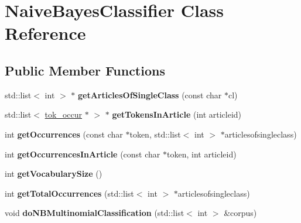 \hypertarget{classNaiveBayesClassifier}{\section{Naive\-Bayes\-Classifier Class Reference}
\label{classNaiveBayesClassifier}
}
\subsection*{Public Member Functions}
\begin{DoxyCompactItemize}
\item 
\hypertarget{classNaiveBayesClassifier_a6f3c5d047afa957a29979d231bc70889}{std\-::list$<$ int $>$ $\ast$ {\bfseries get\-Articles\-Of\-Single\-Class} (const char $\ast$cl)}\label{classNaiveBayesClassifier_a6f3c5d047afa957a29979d231bc70889}

\item 
\hypertarget{classNaiveBayesClassifier_a1fb3616da17ea4ebda17b4f3575ad320}{std\-::list$<$ \hyperlink{structtok__occur}{tok\-\_\-occur} $\ast$ $>$ $\ast$ {\bfseries get\-Tokens\-In\-Article} (int articleid)}\label{classNaiveBayesClassifier_a1fb3616da17ea4ebda17b4f3575ad320}

\item 
\hypertarget{classNaiveBayesClassifier_a89ae9b2c0153869d50e27ecb689982af}{int {\bfseries get\-Occurrences} (const char $\ast$token, std\-::list$<$ int $>$ $\ast$articlesofsingleclass)}\label{classNaiveBayesClassifier_a89ae9b2c0153869d50e27ecb689982af}

\item 
\hypertarget{classNaiveBayesClassifier_aa2d107c48a5457e1d115cfbb839f60e0}{int {\bfseries get\-Occurrences\-In\-Article} (const char $\ast$token, int articleid)}\label{classNaiveBayesClassifier_aa2d107c48a5457e1d115cfbb839f60e0}

\item 
\hypertarget{classNaiveBayesClassifier_a18dfddfbbae1b120bcee49f78c75ded4}{int {\bfseries get\-Vocabulary\-Size} ()}\label{classNaiveBayesClassifier_a18dfddfbbae1b120bcee49f78c75ded4}

\item 
\hypertarget{classNaiveBayesClassifier_a4faf67f3daaba12487cee5886a4a64e9}{int {\bfseries get\-Total\-Occurrences} (std\-::list$<$ int $>$ $\ast$articlesofsingleclass)}\label{classNaiveBayesClassifier_a4faf67f3daaba12487cee5886a4a64e9}

\item 
\hypertarget{classNaiveBayesClassifier_ae51e09d4d9407b43f3d57e814a0cfc27}{void {\bfseries do\-N\-B\-Multinomial\-Classification} (std\-::list$<$ int $>$ \&corpus)}\label{classNaiveBayesClassifier_ae51e09d4d9407b43f3d57e814a0cfc27}


\end{DoxyCompactItemize}
